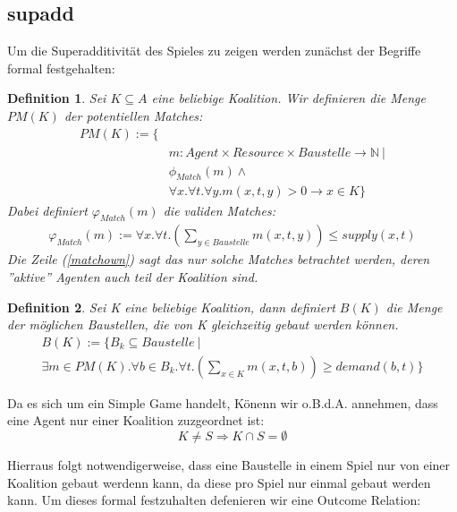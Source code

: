 \documentclass[12pt]{article}
\theoremstyle{break}
\newtheorem{definition}{Definition}
\begin{document}
\subsection{supadd}
\label{supadd}

Um die Superadditivität des Spieles zu zeigen werden zunächst der Begriffe formal festgehalten:

\begin{definition}
  Sei $K\subseteq A$ eine beliebige Koalition. Wir definieren die Menge $PM(K)$ der potentiellen Matches:
  \begin{eqnarray}
    PM(K) := \{ &\\
    &m: Agent\times Resource \times Baustelle \rightarrow \mathbb{N}\ |\\
    & \phi_{Match}(m) \land \\ & \forall x.\forall t.\forall y. m(x,t, y) > 0 \rightarrow x\in K\} \label{matchown}
  \end{eqnarray}
  Dabei definiert $\varphi_{Match}(m)$ die validen Matches:
  \begin{eqnarray}
    \varphi_{Match}(m) := \forall x.\forall t.(\sum_{y\in Baustelle} m(x,t,y))\leq supply(x,t)
  \end{eqnarray}
  Die Zeile (\ref{matchown}) sagt das nur solche Matches betrachtet werden, deren ''aktive'' Agenten auch teil der Koalition sind.
\end{definition}

\begin{definition}
  Sei K eine beliebige Koalition, dann definiert $B(K)$ die Menge der möglichen Baustellen, die von K gleichzeitig gebaut werden können.
  \begin{eqnarray}
    B(K) := \{ B_k\subseteq Baustelle\ |\\
    \exists m\in PM(K).\forall b\in B_k.\forall t.(\sum_{x\in K}m(x,t,b))\geq demand(b, t)\}
  \end{eqnarray}
\end{definition}

Da es sich um ein Simple Game handelt, Könenn wir o.B.d.A. annehmen, dass eine Agent nur einer Koalition zuzgeordnet ist:
\begin{equation}
  K\neq S \Rightarrow K\cap S =\emptyset \label{koalitiondisjunct}
\end{equation}

Hierraus folgt notwendigerweise, dass eine Baustelle in einem Spiel nur von einer Koalition gebaut werdenn kann, da diese pro Spiel nur einmal gebaut werden kann. Um dieses formal festzuhalten defenieren wir eine Outcome Relation:
\end{document}
